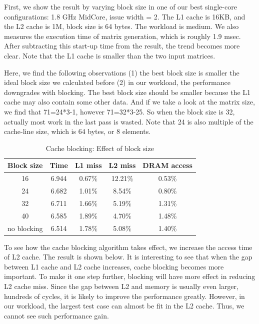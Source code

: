 \documentclass[twocolumn,letterpaper,10pt]{article}
\begin{document}
First, we show the result by varying block size in one of our best
single-core configurations: 1.8 GHz MidCore, issue width = 2. The L1
cache is 16KB, and the L2 cache is 1M, block size is 64 bytes. The workload is medium. We also
measures the execution time of matrix generation, which is roughly 1.9
msec. After subtracting this start-up time from the result, the trend
becomes more clear. Note that the L1 cache is smaller than the two input
matrices.

Here, we find the following observations (1) the best block size is
smaller the ideal block size we calculated before (2) in our workload,
the performance downgrades with blocking. The best block size should be smaller because
the L1 cache may also contain some other data. And if we take a look
at the matrix size, we find that 71=24*3-1, however 71=32*3-25. So
when the block size is 32, actually most work in the last pass is
wasted. Note that 24 is also multiple of the cache-line size, which is
64 bytes, or 8 elements.

\begin{table}[ht!]
\begin{center}
\begin{tabular}{ccccc}
\toprule
Block size & Time & L1 miss & L2 miss & DRAM access \\
\midrule
16 & 6.944 & 0.67\%	 & 12.21\%	& 0.53\% \\
24 & 6.682 &  1.01\% &	8.54\%	& 0.80\% \\ 
32 & 6.711 & 1.66\%	 & 5.19\%	& 1.31\% \\ 
40 & 6.585 &  1.89\% & 4.70\%	& 1.48\% \\ 
no blocking	& 6.514	& 1.78\% & 5.08\%	& 1.40\% \\
\bottomrule
\end{tabular}
\end{center}
\label{fig:blocking}
\caption{Cache blocking: Effect of block size}
\end{table}


To see how the cache blocking algorithm takes effect, we increase the
access time of L2 cache. The result is shown below. It is interesting
to see that when the gap between L1 cache and L2 cache increases, 
cache blocking becomes more important. To make it one step further,
blocking will have more effect in reducing L2 cache miss. Since the
gap between L2 and memory is usually even larger, hundreds of cycles,
it is likely to improve the performance greatly. However, in our
workload, the largest test case can almost be fit in the L2
cache. Thus, we cannot see such performance gain.
\end{document}
